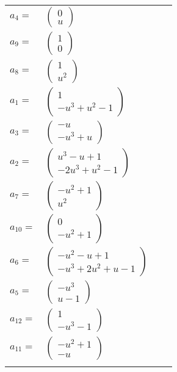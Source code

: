\documentclass[1p]{elsarticle_modified}
\theoremstyle{definition}
\begin{document}
\begin{tabular}{m{7pt} m{180pt} m{7pt} m{180pt} }
\flushright $a_{4}=$&$\begin{pmatrix}0\\u\end{pmatrix}$ \\
\flushright $a_{9}=$&$\begin{pmatrix}1\\0\end{pmatrix}$ \\
\flushright $a_{8}=$&$\begin{pmatrix}1\\u^2\end{pmatrix}$ \\
\flushright $a_{1}=$&$\begin{pmatrix}1\\- u^3+u^2-1\end{pmatrix}$ \\
\flushright $a_{3}=$&$\begin{pmatrix}- u\\- u^3+u\end{pmatrix}$ \\
\flushright $a_{2}=$&$\begin{pmatrix}u^3- u+1\\-2 u^3+u^2-1\end{pmatrix}$ \\
\flushright $a_{7}=$&$\begin{pmatrix}- u^2+1\\u^2\end{pmatrix}$ \\
\flushright $a_{10}=$&$\begin{pmatrix}0\\- u^2+1\end{pmatrix}$ \\
\flushright $a_{6}=$&$\begin{pmatrix}- u^2- u+1\\- u^3+2 u^2+u-1\end{pmatrix}$ \\
\flushright $a_{5}=$&$\begin{pmatrix}- u^3\\u-1\end{pmatrix}$ \\
\flushright $a_{12}=$&$\begin{pmatrix}1\\- u^3-1\end{pmatrix}$ \\
\flushright $a_{11}=$&$\begin{pmatrix}- u^2+1\\- u\end{pmatrix}$\\&\end{tabular}
\end{document}
